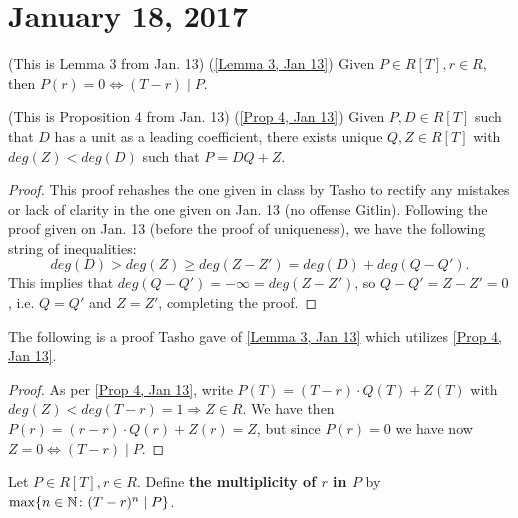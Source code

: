 \section{January 18, 2017}
\begin{unnumlemma}
(This is Lemma 3 from Jan. 13) (\ref{Lemma 3, Jan 13}) Given $P \in R[T], r \in R$, then $P(r) = 0 \Leftrightarrow (T - r) \mid P$.
\end{unnumlemma}

\begin{unnumprop}
(This is Proposition 4 from Jan. 13) (\ref{Prop 4, Jan 13}) Given $P, D \in R[T]$ such that $D$ has a unit as a leading coefficient, there exists unique $Q, Z \in R[T]$ with $deg(Z) < deg(D)$ such that $P = DQ + Z$.
\end{unnumprop}

\begin{proof}
This proof rehashes the one given in class by Tasho to rectify any mistakes or lack of clarity in the one given on Jan. 13 (no offense Gitlin). Following the proof given on Jan. 13 (before the proof of uniqueness), we have the following string of inequalities:
\[deg(D) > deg(Z) \geq deg(Z - Z') = deg(D) + deg(Q - Q').\]
This implies that $deg(Q - Q') = -\infty = deg(Z - Z')$, so $Q - Q' = Z - Z' = 0$, i.e. $Q = Q'$ and $Z = Z'$, completing the proof.
\end{proof}

The following is a proof Tasho gave of \ref{Lemma 3, Jan 13} which utilizes \ref{Prop 4, Jan 13}.
\begin{proof}
As per \ref{Prop 4, Jan 13}, write $P(T) = (T - r) \cdot Q(T) + Z(T)$ with $deg(Z) < deg(T - r) = 1 \Rightarrow Z \in R$. We have then $P(r) = (r - r) \cdot Q(r) + Z(r) = Z$, but since $P(r) = 0$ we have now $Z = 0 \Leftrightarrow (T - r) \mid P$.
\end{proof}
\setcounter{thm}{-1}
\begin{defn} \label{Defn 0, Jan 18}
Let $P \in R[T], r \in R$. Define \textbf{the multiplicity of $r$ in $P$} by $\max\{n \in \mathbb{N} \colon (T - r)^n \mid P\}$.
\end{defn}

